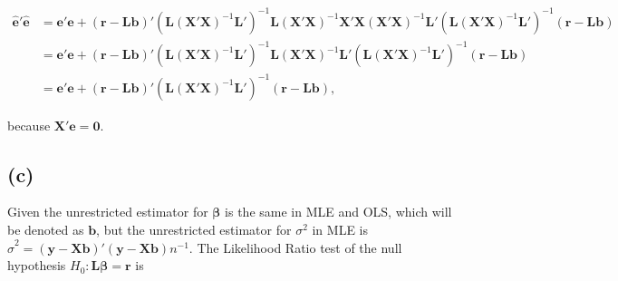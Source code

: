\documentclass[
]{article}
\begin{document}
\begin{align*}
\hat{\boldsymbol{e}}'\hat{\boldsymbol{e}} &= \boldsymbol{e}'\boldsymbol{e} + (\boldsymbol{r}-\boldsymbol{L}\boldsymbol{b})'(\boldsymbol{L}(\boldsymbol{X}'\boldsymbol{X})^{-1}\boldsymbol{L}')^{-1}\boldsymbol{L}(\boldsymbol{X}'\boldsymbol{X})^{-1}\boldsymbol{X}'\boldsymbol{X}(\boldsymbol{X}'\boldsymbol{X})^{-1}\boldsymbol{L}'(\boldsymbol{L}(\boldsymbol{X}'\boldsymbol{X})^{-1}\boldsymbol{L}')^{-1}(\boldsymbol{r}-\boldsymbol{L}\boldsymbol{b}) \\ 
&=  \boldsymbol{e}'\boldsymbol{e} + (\boldsymbol{r}-\boldsymbol{L}\boldsymbol{b})'(\boldsymbol{L}(\boldsymbol{X}'\boldsymbol{X})^{-1}\boldsymbol{L}')^{-1}\boldsymbol{L}(\boldsymbol{X}'\boldsymbol{X})^{-1}\boldsymbol{L}'(\boldsymbol{L}(\boldsymbol{X}'\boldsymbol{X})^{-1}\boldsymbol{L}')^{-1}(\boldsymbol{r}-\boldsymbol{L}\boldsymbol{b}) \\
&= \boldsymbol{e}'\boldsymbol{e} + (\boldsymbol{r}-\boldsymbol{L}\boldsymbol{b})'(\boldsymbol{L}(\boldsymbol{X}'\boldsymbol{X})^{-1}\boldsymbol{L}')^{-1}(\boldsymbol{r}-\boldsymbol{L}\boldsymbol{b}),
\end{align*}

because \(\boldsymbol{X}'\boldsymbol{e} = \boldsymbol{0}\).

\hypertarget{c-1}{%
\subsection{(c)}\label{c-1}}

Given the unrestricted estimator for \(\boldsymbol{\beta}\) is the same
in MLE and OLS, which will be denoted as \(\boldsymbol{b}\), but the
unrestricted estimator for \(\sigma^2\) in MLE is
\(\hat{\sigma}^2 = (\boldsymbol{y}-\boldsymbol{X}\boldsymbol{b})'(\boldsymbol{y}-\boldsymbol{X}\boldsymbol{b})n^{-1}\).
The Likelihood Ratio test of the null hypothesis
\(H_0: \boldsymbol{L}\boldsymbol{\beta} = \boldsymbol{r}\) is
\end{document}

